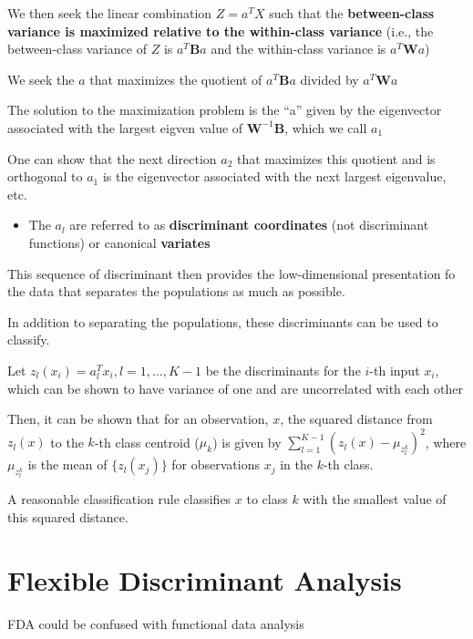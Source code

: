 \documentclass[
]{book}
\providecommand{\tightlist}{%
  \setlength{\itemsep}{0pt}\setlength{\parskip}{0pt}}
\begin{document}
We then seek the linear combination \(Z = a^T X\) such that the \textbf{between-class variance is maximized relative to the within-class variance} (i.e., the between-class variance of \(Z\) is \(a^T \mathbf{B} a\) and the within-class variance is \(a^T \mathbf{W}a\))

We seek the \(a\) that maximizes the quotient of \(a^T \mathbf{B} a\) divided by \(a^T \mathbf{W} a\)

The solution to the maximization problem is the ``a'' given by the eigenvector associated with the largest eigven value of \(\mathbf{W}^{-1}\mathbf{B}\), which we call \(a_1\)

One can show that the next direction \(a_2\) that maximizes this quotient and is orthogonal to \(a_1\) is the eigenvector associated with the next largest eigenvalue, etc.

\begin{itemize}
\tightlist
\item
  The \(a_l\) are referred to as \textbf{discriminant coordinates} (not discriminant functions) or canonical \textbf{variates}
\end{itemize}

This sequence of discriminant then provides the low-dimensional presentation fo the data that separates the populations as much as possible.

In addition to separating the populations, these discriminants can be used to classify.

Let \(z_l(x_i) = a^T_l x_i, l = 1, \dots, K-1\) be the discriminants for the \(i\)-th input \(x_i\), which can be shown to have variance of one and are uncorrelated with each other

Then, it can be shown that for an observation, \(x\), the squared distance from \(z_l(x)\) to the \(k\)-th class centroid (\(\mu_k\)) is given by \(\sum_{l=1}^{K-1}(z_l (x) - \mu_{z_l^k})^2\), where \(\mu_{z_l^k}\) is the mean of \(\{z_l(x_j)\}\) for observations \(x_j\) in the \(k\)-th class.

A reasonable classification rule classifies \(x\) to class \(k\) with the smallest value of this squared distance.

\hypertarget{flexible-discriminant-analysis}{%
\section{Flexible Discriminant Analysis}\label{flexible-discriminant-analysis}}

FDA could be confused with functional data analysis
\end{document}
